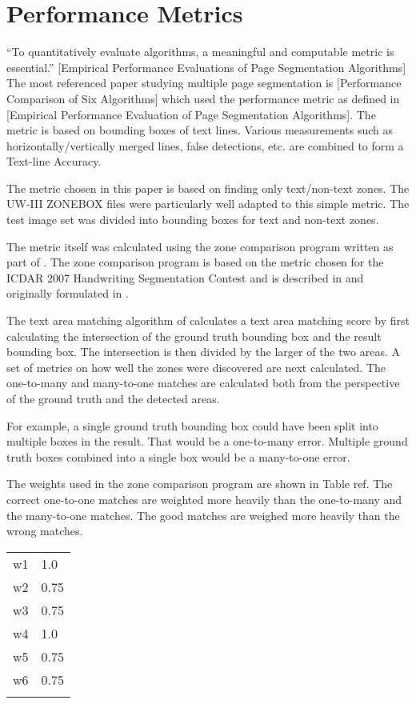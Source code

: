 \documentclass[conference]{IEEEtran}
\begin{document}
%
%
\section{Performance Metrics}
``To quantitatively evaluate algorithms, a meaningful and computable metric is
essential.'' [Empirical Performance Evaluations of Page Segmentation Algorithms]
The most referenced paper studying multiple page segmentation is [Performance
Comparison of Six Algorithms] which used the performance metric as defined in
[Empirical Performance Evaluation of Page Segmentation Algorithms]. The metric
is based on bounding boxes of text lines. Various measurements such as
horizontally/vertically merged lines, false detections, etc. are combined to
form a Text-line Accuracy.

The metric chosen in this paper is based on finding only text/non-text zones.
The UW-III ZONEBOX files were particularly well adapted to this simple
metric. The \cite{IEEEhowto:Winder} test image set was divided into bounding boxes for text
and non-text zones. 

The metric itself was calculated using the zone comparison program written as
part of \cite{IEEEhowto:Winder}. The zone comparison program is based on the
metric chosen for the ICDAR 2007 Handwriting Segmentation Contest and is
described in \cite{IEEEhowto:Gatos} and originally formulated in
\cite{IEEEhowto:Philips}. 

The text area matching algorithm of \cite{IEEEhowto:Philips} calculates a
text area matching score by first calculating the intersection of the ground
truth bounding box and the result bounding box. The intersection is
then divided by the larger of the two areas. A set of metrics on how well the
zones were discovered are next calculated.  The one-to-many and many-to-one
matches are calculated both from the perspective of the ground truth and the
detected areas. 

For example, a single ground truth bounding box could have been split into
multiple boxes in the result. That would be a one-to-many error. Multiple
ground truth boxes combined into a single box would be a many-to-one error.

The weights used in the zone comparison program are shown in Table ref. The
correct one-to-one matches are weighted more heavily than the one-to-many and
the many-to-one matches. The good matches are weighed more heavily than the
wrong matches.

\begin{tabular}{|r|l|}
\hline
    w1 & 1.0  \\
    w2 & 0.75 \\
    w3 & 0.75 \\
    w4 & 1.0  \\
    w5 & 0.75 \\
    w6 & 0.75 \\
\hline
\label{table:table-weights}
\end{tabular}
\end{document}
